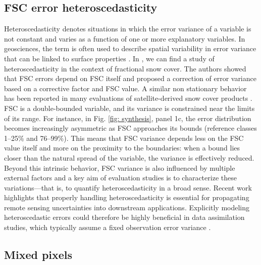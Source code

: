 \documentclass[tc, manuscript]{copernicus}
\begin{document}
\subsection{FSC error heteroscedasticity} 

Heteroscedasticity denotes situations in which the error variance of a variable is not constant and varies as a function of one or more explanatory variables. In geosciences, the term is often used to describe spatial variability in error variance that can be linked to surface properties \citep{hugonnet2022UncertaintyAnalysisDigital}. In \citep{aalstad_evaluating_2020}, we can find a study of heteroscedasticity in the context of fractional snow cover. The authors showed that FSC errors depend on FSC itself and proposed a correction of error variance based on a corrective factor and FSC value. A similar non stationary behavior has been reported in many evaluations of satellite-derived snow cover products \citep{jacques-hamilton_measurement_2025, stillinger_landsat_2023, schwaizer2020SnowCoverExtentb}.
FSC is a double-bounded variable, and its variance is constrained near the limits of its range. For instance, in Fig. \ref{fig: synthesis}, panel 1c, the error distribution becomes increasingly asymmetric as FSC approaches its bounds (reference classes 1–25\% and 76–99\%). This means that FSC variance depends less on the FSC value itself and more on the proximity to the boundaries: when a bound lies closer than the natural spread of the variable, the variance is effectively reduced. Beyond this intrinsic behavior, FSC variance is also influenced by multiple external factors and a key aim of evaluation studies is to characterize these variations—that is, to quantify heteroscedasticity in a broad sense. Recent work \citep{hugonnet2022UncertaintyAnalysisDigital} highlights that properly handling heteroscedasticity is essential for propagating remote sensing uncertainties into downstream applications. Explicitly modeling heteroscedastic errors could therefore be highly beneficial in data assimilation studies, which typically assume a fixed observation error variance \citep{baba_assimilation_2018}.


\subsection{Mixed pixels}
\label{subsec: mixed_pixels}
\end{document}
